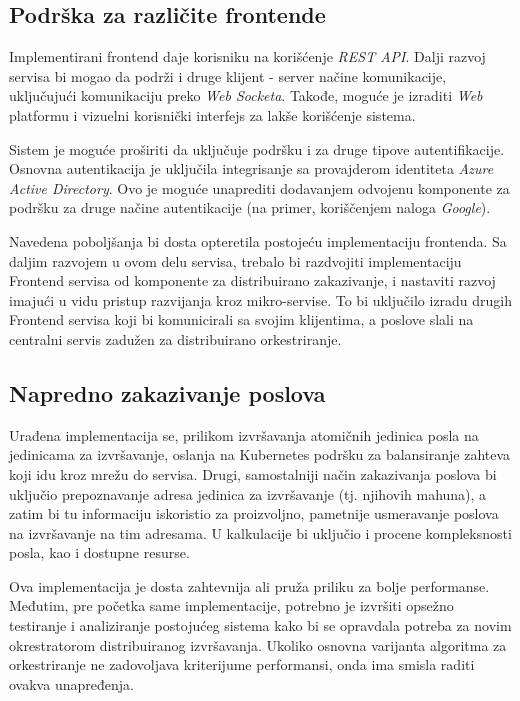 \documentclass[12pt,oneside]{memoir}
\begin{document}
\subsection{Podrška za različite frontende}

Implementirani frontend daje korisniku na korišćenje \emph{REST API}. Dalji razvoj servisa bi mogao da podrži i druge klijent - server načine komunikacije, uključujući komunikaciju preko \emph{Web Socketa}. Takođe, moguće je izraditi \emph{Web} platformu i vizuelni korisnički interfejs za lakše korišćenje sistema.

Sistem je moguće proširiti da uključuje podršku i za druge tipove autentifikacije. Osnovna autentikacija je uključila integrisanje sa provajderom identiteta \emph{Azure Active Directory}. Ovo je moguće unaprediti dodavanjem odvojenu komponente za podršku za druge načine autentikacije (na primer, koriščenjem naloga \emph{Google}).

Navedena poboljšanja bi dosta opteretila postojeću implementaciju frontenda. Sa daljim razvojem u ovom delu servisa, trebalo bi razdvojiti implementaciju Frontend servisa od komponente za distribuirano zakazivanje, i nastaviti razvoj imajući u vidu pristup razvijanja kroz mikro-servise. To bi uključilo izradu drugih Frontend servisa koji bi komunicirali sa svojim klijentima, a poslove slali na centralni servis zadužen za distribuirano orkestriranje.

\subsection{Napredno zakazivanje poslova}

Urađena implementacija se, prilikom izvršavanja atomičnih jedinica posla na jedinicama za izvršavanje, oslanja na Kubernetes podršku za balansiranje zahteva koji idu kroz mrežu do servisa. Drugi, samostalniji način zakazivanja poslova bi uključio prepoznavanje adresa jedinica za izvršavanje (tj. njihovih mahuna), a zatim bi tu informaciju iskoristio za proizvoljno, pametnije usmeravanje poslova na izvršavanje na tim adresama. U kalkulacije bi uključio i procene kompleksnosti posla, kao i dostupne resurse.

Ova implementacija je dosta zahtevnija ali pruža priliku za bolje performanse. Međutim, pre početka same implementacije, potrebno je izvršiti opsežno testiranje i analiziranje postojućeg sistema kako bi se opravdala potreba za novim okrestratorom distribuiranog izvršavanja. Ukoliko osnovna varijanta algoritma za orkestriranje ne zadovoljava kriterijume performansi, onda ima smisla raditi ovakva unapređenja.
\end{document}
